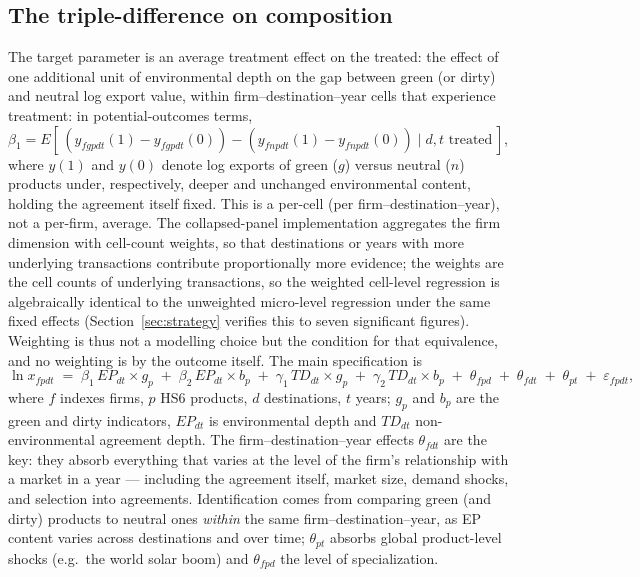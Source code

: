 \documentclass[12pt]{article}
\begin{document}
\subsection{The triple-difference on composition}

The target parameter is an average treatment effect on the treated: the effect of one
additional unit of environmental depth on the gap between green (or dirty) and neutral
log export value, within firm--destination--year cells that experience treatment: in
potential-outcomes terms, $\beta_1 = E[\,(y_{fgpdt}(1) - y_{fgpdt}(0)) - (y_{fnpdt}(1) -
y_{fnpdt}(0))\mid d,t \text{ treated}\,]$, where $y(1)$ and $y(0)$ denote log exports of
green ($g$) versus neutral ($n$) products under, respectively, deeper and unchanged
environmental content, holding the agreement itself fixed. This is a per-cell (per
firm--destination--year), not a per-firm, average. The collapsed-panel implementation
aggregates the firm dimension with cell-count weights, so that destinations or years with
more underlying transactions contribute proportionally more evidence; the weights are the
cell counts of underlying transactions, so the weighted cell-level regression is
algebraically identical to the unweighted micro-level regression under the same fixed
effects (Section~\ref{sec:strategy} verifies this to seven significant figures).
Weighting is thus not a modelling choice but the condition for that equivalence, and no
weighting is by the outcome itself. The main specification is
\begin{equation}\label{eq:main}
\ln x_{fpdt} \;=\; \beta_1\, EP_{dt}\times g_p \;+\; \beta_2\, EP_{dt}\times b_p
\;+\; \gamma_1\, TD_{dt}\times g_p \;+\; \gamma_2\, TD_{dt}\times b_p
\;+\; \theta_{fpd} \;+\; \theta_{fdt} \;+\; \theta_{pt} \;+\; \varepsilon_{fpdt},
\end{equation}
where $f$ indexes firms, $p$ HS6 products, $d$ destinations, $t$ years; $g_p$ and $b_p$
are the green and dirty indicators, $EP_{dt}$ is environmental depth and $TD_{dt}$
non-environmental agreement depth. The firm--destination--year effects $\theta_{fdt}$
are the key: they absorb everything that varies at the level of the firm's relationship
with a market in a year --- including the agreement itself, market size, demand shocks,
and selection into agreements. Identification comes from comparing green (and dirty)
products to neutral ones \emph{within} the same firm--destination--year, as EP content
varies across destinations and over time; $\theta_{pt}$ absorbs global product-level
shocks (e.g.\ the world solar boom) and $\theta_{fpd}$ the level of specialization.
\end{document}
